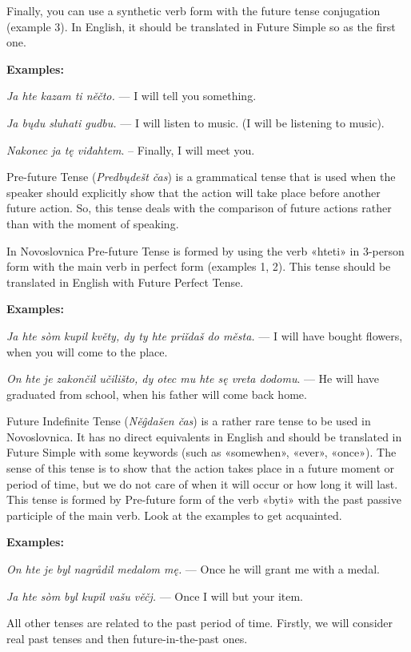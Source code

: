 Finally, you can use a synthetic verb form with the future tense conjugation (example 3). In English, it should be translated in Future Simple so as the first one.

\textbf{Examples:}

\textit{Ja hte kazam ti něčto.} — I will tell you something.

\textit{Ja bųdu sluhati gudbu.} — I will listen to music. (I will be listening to music).

\textit{Nakonec ja tę viđahtem}. – Finally, I will meet you.

Pre-future Tense (\textit{Predbųdešt čas}) is a grammatical tense that is used when the speaker should explicitly show that the action will take place before another future action. So, this tense deals with the comparison of future actions rather than with the moment of speaking.

In Novoslovnica Pre-future Tense is formed by using the verb «hteti» in 3-person form with the main verb in perfect form (examples 1, 2). This tense should be translated in English with Future Perfect Tense.

\textbf{Examples:}

\textit{Ja hte sòm kupil květy, dy ty hte priǐdaš do města.} — I will have bought flowers, when you will come to the place.

\textit{On hte je zakončil učilišto, dy otec mu hte sę vreta dodomu}. — He will have graduated from school, when his father will come back home.

Future Indefinite Tense (\textit{Něĝdašen čas}) is a rather rare tense to be used in Novoslovnica. It has no direct equivalents in English and should be translated in Future Simple with some keywords (such as «somewhen», «ever», «once»). The sense of this tense is to show that the action takes place in a future moment or period of time, but we do not care of when it will occur or how long it will last.
This tense is formed by Pre-future form of the verb «byti» with the past passive participle of the main verb. Look at the examples to get acquainted.

\textbf{Examples:}

\textit{On hte je byl nagrådil medalom mę.} — Once he will grant me with a medal.

\textit{Ja hte sòm byl kupil vašu věčj.} — Once I will but your item.

All other tenses are related to the past period of time. Firstly, we will consider real past tenses and then future-in-the-past ones.

